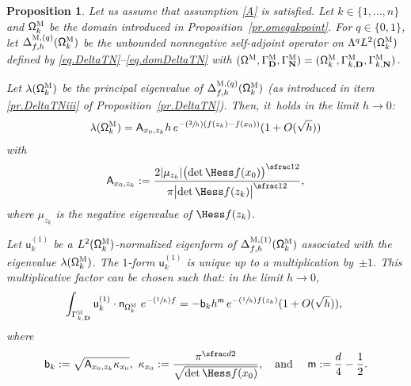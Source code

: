 \documentclass[10pt]{amsart}
\newcommand{\Psfrac}[2]{(\sfrac{#1}{#2})}
\newcommand{\quand}{\quad\text{and}\quad}
\newcommand{\mbf}[1]{\mathbf{#1}}
\theoremstyle{plain}
\newtheorem{proposition}{Proposition}
\theoremstyle{definition}
\begin{document}
\begin{proposition}
\label{pr.VP-DeltaTN}
Let us assume that assumption \ref{A} is satisfied. Let
$k\in\{1,\ldots,n\}$ and $ \mathsf \Omega_k^{\textsc{M}} $ be the
domain introduced in Proposition~\ref{pr.omegakpoint}. For $q\in\{0,1\}$, let $\Delta_{f,h}^{\textsc{M}, (q)}(\mathsf \Omega_k^{\textsc{M}})$ be the unbounded
nonnegative self-adjoint operator on
$ \Lambda^qL^{2} (\mathsf \Omega_k^{\textsc{M}})$ defined by \eqref{eq.DeltaTN}--\eqref{eq.domDeltaTN} with $(\mathsf \Omega^{\textsc{M}}, \Gamma^{\textsc{M}}_{\mbf D}, \Gamma^{\textsc{M}}_{\mbf N}) = (\mathsf \Omega_k^{\textsc{M}}, \Gamma_{k,\mbf D}^{\textsc{M}}, \Gamma_{k,\mbf N}^{\textsc{M}})$.

Let $\lambda(\mathsf \Omega_k^{\textsc{M}})$ be the principal
eigenvalue of $\Delta_{f,h}^{\textsc{M}, (q)}(\mathsf
\Omega_k^{\textsc{M}})$ (as introduced in item \eqref{pr.DeltaTNiii} of Proposition~\ref{pr.DeltaTN}). Then, it~holds in the limit $h\to 0$:
\begin{align}
\label{eq.DL-blambda1}
\lambda(\mathsf \Omega_k^{\textsc{M}})= \mathsf A_{x_0,z_k} h \, e^{-\Psfrac 2h (f(z_k)-f(x_0))} (1+O(\sqrt h))
\end{align}
with\vspace*{-4pt}
\begin{align}
\label{eq.ax0zk}
\mathsf A_{x_0,z_k}:=\frac{ 2\vert \mu_{z_k}\vert \bigl(\det \Hess f (x_0) \bigr)^{\sfrac12} }{ \pi \bigl\vert \det \Hess f (z_k) \bigr\vert^{\sfrac12}},
\end{align}
where $\mu_{z_k}$ is the negative eigenvalue of $\Hess f (z_k)$.

Let $\mathsf u^{(1)}_k$ be a $L^2(\mathsf
\Omega_k^{\textsc{M}})$-normalized eigenform of $
\Delta_{f,h}^{\textsc{M},(1)} (\mathsf \Omega_k^{\textsc{M}}) $
associated with the eigenvalue $\lambda(\mathsf
\Omega_k^{\textsc{M}})$. The $1$-form $\mathsf u^{(1)}_k$ is unique
up to a multiplication by~$\pm 1$. This multiplicative factor can be
chosen such that: in the limit $h\to 0$,\vspace*{-3pt}
\begin{align}\label{eq.DL-boun1}
\int_{\Gamma_{k,\mbf D}^{\textsc{M}}}\mathsf u^{(1)}_k \cdot \mathsf n_{ \mathsf \Omega_k^{\textsc{M}} }\ e^{-\Psfrac 1hf}=-\mathsf b_k h^{\mathsf m} \, e^{-\Psfrac 1h f(z_k)} (1+O(\sqrt h)),\
\end{align}
where\vspace*{-4pt}
\begin{align}\label{eq.kappa_0}
\mathsf b_k:=\sqrt{\mathsf A_{x_0,z_k}\kappa_{x_0}}, \ \kappa_{x_0}:=\frac{\pi^{\sfrac d2}}{ \sqrt{\det \Hess f(x_0)}}, \quand \ \mathsf m:= {\frac d4}-\frac 12.
\end{align}
\end{proposition}
\end{document}
